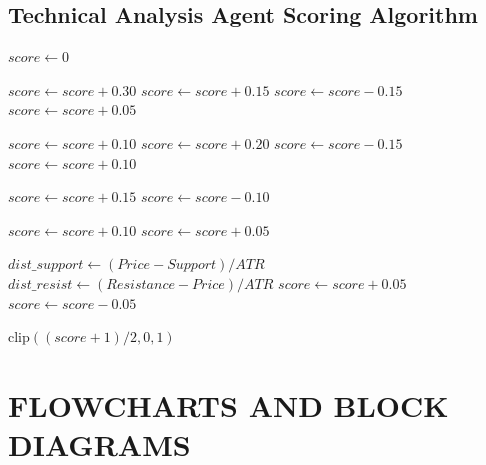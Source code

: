 \documentclass[12pt,a4paper]{report}
\begin{document}
\section{Technical Analysis Agent Scoring Algorithm}
\begin{algorithm}[H]
\caption{Technical Agent Rule-Based Scoring}
\label{alg:tech_agent}
\begin{algorithmic}[1]
\STATE $score \gets 0$

 \STATE $score \gets score + 0.30$
 \STATE $score \gets score + 0.15$
 \STATE $score \gets score - 0.15$
\ENDIF
{} \STATE $score \gets score + 0.05$ 

 \STATE $score \gets score + 0.10$ 
 \STATE $score \gets score + 0.20$ 
 \STATE $score \gets score - 0.15$ 
\ENDIF
{} \STATE $score \gets score + 0.10$

 \STATE $score \gets score + 0.15$
 \STATE $score \gets score - 0.10$
\ENDIF

 \STATE $score \gets score + 0.10$
 \STATE $score \gets score + 0.05$

\STATE $dist\_support \gets (Price - Support) / ATR$
\STATE $dist\_resist \gets (Resistance - Price) / ATR$
 \STATE $score \gets score + 0.05$
 \STATE $score \gets score - 0.05$

\RETURN $\text{clip}((score + 1) / 2, 0, 1)$ 
\ENDFUNCTION
\end{algorithmic}
\end{algorithm}

\chapter{FLOWCHARTS AND BLOCK DIAGRAMS}
\end{document}
